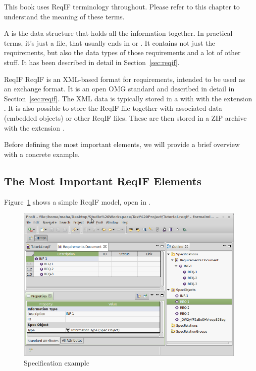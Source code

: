 \begin{info}
This book uses ReqIF terminology throughout.  Please refer to this chapter to understand the meaning of these terms.
\end{info}

A  is the data structure that holds all the information together.  In practical terms, it's just a file, that usually ends in  or .  It contains not just the requirements, but also the data types of those requirements and a lot of other stuff.  It has been described in detail in Section~\ref{sec:reqif}.

\begin{definition}{ReqIF}
ReqIF is an XML-based format for requirements, intended to be used as an exchange format.  It is an open OMG standard and described in detail in Section~\ref{sec:reqif}. The XML data is typically stored in a with with the extension .  It is also possible to store the ReqIF file together with associated data (embedded objects) or other ReqIF files.  These are then stored in a ZIP archive with the extension .
\end{definition}

Before defining the most important elements, we will provide a brief overview with a concrete example.

\subsection{The Most Important ReqIF Elements}
\label{sec:important_elements}

Figure~\ref{fig:spec_example} shows a simple ReqIF model, open in \pror{}.  

\begin{figure}
  \centering
  \includegraphics[width=\textwidth]{../rmf-images/screenshot_INF_1.png}
  \caption{Specification example}
  \label{fig:spec_example}
\end{figure}

